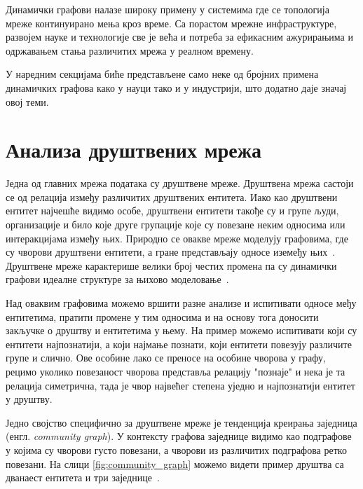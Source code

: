 
Динамички графови налазе широку примену у системима где се топологија мреже континуирано мења кроз време. Са порастом мрежне инфраструктуре, развојем науке и технологије све је већа и потреба за ефикасним ажурирањима и одржавањем стања различитих мрежа у реалном времену.

У наредним секцијама биће представљене само неке од бројних примена динамичких графова како у науци тако и у индустрији, што додатно даје значај овој теми.

\section{Анализа друштвених мрежа}

Једна од главних мрежа података су друштвене мреже. Друштвена мрежа састоји се од релација између различитих друштвених ентитета. Иако као друштвени ентитет најчешће видимо особе, друштвени ентитети такође су и групе људи, организације и било које друге групације које су повезане неким односима или интеракцијама између њих. Природно се овакве мреже моделују графовима, где су чворови друштвени ентитети, а гране представљају односе иземеђу њих~\cite{tabassumSocialNetworkAnalysis2018}. Друштвене мреже карактерише велики број честих промена па су динамички графови идеалне структуре за њихово моделовање~\cite{APPLICATIONS_OF_DYNAMIC_GRAPH}.

Над оваквим графовима можемо вршити разне анализе и испитивати односе међу ентитетима, пратити промене у тим односима и на основу тога доносити закључке о друштву и ентитетима у њему. На пример можемо испитивати који су ентитети најпознатији, а који најмање познати, који ентитети повезују различите групе и слично. Ове особине лако се преносе на особине чворова у графу, рецимо уколико повезаност чворова представља релацију "познаје" и нека је та релација симетрична, тада је чвор највећег степена уједно и најпознатији ентитет у друштву. 

Једно својство специфично за друштвене мреже је тенденција креирања заједница (енгл. \textit{community graph}). У контексту графова заједнице видимо као подграфове у којима су чворови густо повезани, а чворови из различитих подграфова ретко повезани. На слици \ref{fig:community_graph} можемо видети пример друштва са дванаест ентитета и три заједнице~\cite{tabassumSocialNetworkAnalysis2018}.


